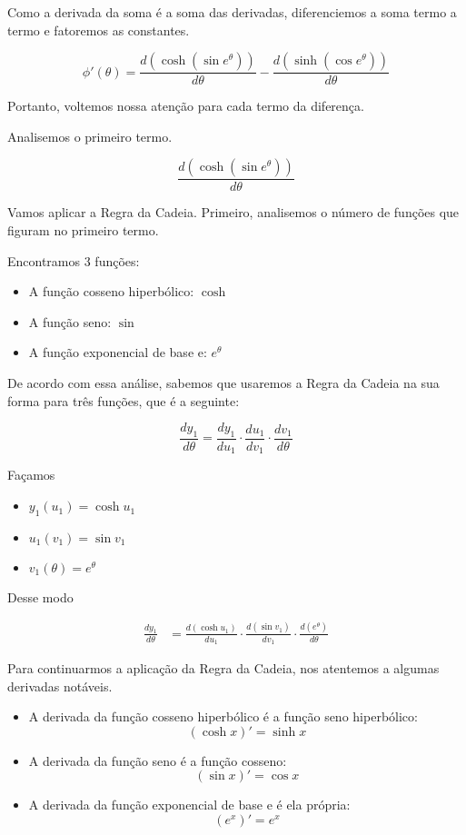 \documentclass{article}
\begin{document}
Como a derivada da soma é a soma das derivadas, diferenciemos a soma termo a termo e fatoremos as constantes.

\begin{equation}\label{eq:q3_diferenca}
    \phi'(\theta) = \frac{d(\cosh(\sin e^{\theta}))}{d\theta}
    - \frac{d(\sinh(\cos e^{\theta}))}{d\theta}
\end{equation}

Portanto, voltemos nossa atenção para cada termo da diferença.

Analisemos o primeiro termo.

\[
    \frac{d(\cosh(\sin e^{\theta}))}{d\theta}
\]

Vamos aplicar a Regra da Cadeia. Primeiro, analisemos o número
de funções que figuram no primeiro termo.

Encontramos 3 funções:

\begin{itemize}
    \item A função cosseno hiperbólico: \(\cosh\)
    \item A função seno: \(\sin\)
    \item A função exponencial de base e: \(e^{\theta}\)
\end{itemize}

De acordo com essa análise, sabemos que usaremos a
Regra da Cadeia na sua forma para três funções, que é a seguinte:

\[
    \frac{dy_1}{d \theta}
    =
    \frac{dy_1}{du_1} \cdot \frac{du_1}{dv_1} \cdot \frac{dv_1}{d \theta}
\]

Façamos

\begin{itemize}
    \item \(y_1(u_1) = \cosh u_1\)
    \item \(u_1(v_1) = \sin v_1 \)
    \item \(v_1(\theta) = e^{\theta}\)
\end{itemize}

Desse modo

\begin{align*}
    \frac{dy_1}{d \theta}
     & = \frac{d(\cosh u_1)}{du_1} \cdot \frac{d(\sin v_1)}{dv_1} \cdot \frac{d(e^{\theta})}{d \theta}
\end{align*}

Para continuarmos a aplicação da Regra da Cadeia,
nos atentemos a algumas derivadas notáveis.

\begin{itemize}
    \item A derivada da função cosseno hiperbólico é a função seno hiperbólico:
          \[
              (\cosh x)' = \sinh x
          \]
    \item A derivada da função seno é a função cosseno:
          \[
              (\sin x)' = \cos x
          \]
    \item A derivada da função exponencial de base e é ela própria:
          \[
              (e^x)' = e^x
          \]
\end{itemize}
\end{document}
